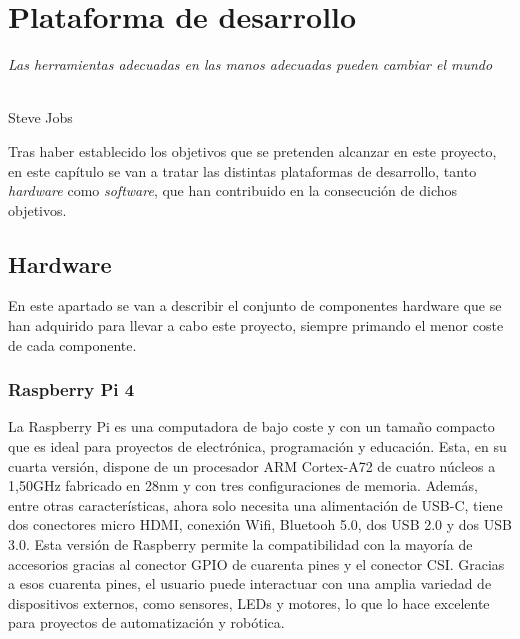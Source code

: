 \chapter{Plataforma de desarrollo}
\label{cap:capitulo3}

\begin{flushright}
\begin{minipage}[]{10cm}
\emph{Las herramientas adecuadas en las manos adecuadas pueden cambiar el mundo}\\
\end{minipage}\\

Steve Jobs\\
\end{flushright}

\vspace{1cm}

Tras haber establecido los objetivos que se pretenden alcanzar en este proyecto, en este capítulo se van a tratar las distintas plataformas de desarrollo, tanto \textit{hardware} como \textit{software}, que han contribuido en la consecución de dichos objetivos.

\section{Hardware}

En este apartado se van a describir el conjunto de componentes hardware que se han adquirido para llevar a cabo este proyecto, siempre primando el menor coste de cada componente.

\subsection{Raspberry Pi 4}

La Raspberry Pi es una computadora de bajo coste y con un tamaño compacto que es ideal para proyectos de electrónica, programación y educación. Esta, en su cuarta versión, dispone de un procesador ARM Cortex-A72 de cuatro núcleos a 1,50GHz fabricado en 28nm y con tres configuraciones de memoria. Además, entre otras características, ahora solo necesita una alimentación de USB-C, tiene dos conectores micro HDMI, conexión Wifi, Bluetooh 5.0, dos USB 2.0 y dos USB 3.0. Esta versión de Raspberry permite la compatibilidad con la mayoría de accesorios gracias al conector GPIO de cuarenta pines y el conector \ac{CSI}. Gracias a esos cuarenta pines, el usuario puede interactuar con una amplia variedad de dispositivos externos, como sensores, LEDs y motores, lo que lo hace excelente para proyectos de automatización y robótica. 

